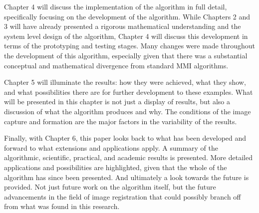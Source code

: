 Chapter 4 will discuss the implementation of the algorithm in full detail, specifically focusing on the development of the algorithm. While Chapters 2 and 3 will have already presented a rigorous mathematical understanding and the system level design of the algorithm, Chapter 4 will discuss this development in terms of the prototyping and testing stages. Many changes were made throughout the development of this algorithm, especially given that there was a substantial conceptual and mathematical divergence from standard MMI algorithms.

Chapter 5 will illuminate the results: how they were achieved, what they show, and what possibilities there are for further development to these examples. What will be presented in this chapter is not just a display of results, but also a discussion of what the algorithm produces and why. The conditions of the image capture and formation are the major factors in the variability of the results.

Finally, with Chapter 6, this paper looks back to what has been developed and forward to what extensions and applications apply. A summary of the algorithmic, scientific, practical, and academic results is presented. More detailed applications and possibilities are highlighted, given that the whole of the algorithm has since been presented. And ultimately a look towards the future is provided. Not just future work on the algorithm itself, but the future advancements in the field of image registration that could possibly branch off from what was found in this research.




